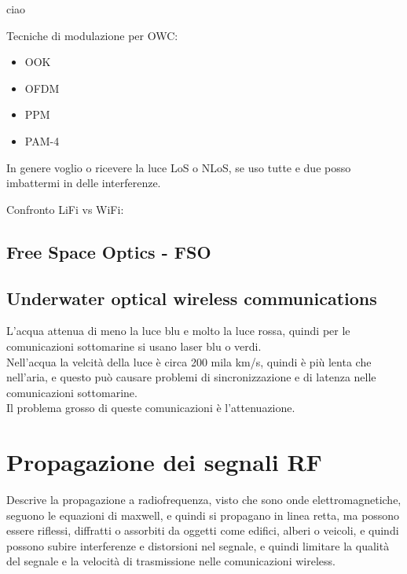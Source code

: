 ciao

Tecniche di modulazione per OWC:
\begin{itemize}
    \item OOK
    \item OFDM
    \item PPM
    \item PAM-4
\end{itemize}

In genere voglio o ricevere la luce LoS o NLoS, se uso tutte e due posso imbattermi in delle interferenze.

Confronto LiFi vs WiFi:

\subsection{Free Space Optics - FSO}

\subsection{Underwater optical wireless communications}
L'acqua attenua di meno la luce blu e molto la luce rossa, quindi per le comunicazioni sottomarine si usano laser blu o verdi.\\

Nell'acqua la velcità della luce è circa 200 mila km/s, quindi è più lenta che nell'aria, e questo può causare problemi di sincronizzazione e di latenza nelle comunicazioni sottomarine.\\

Il problema grosso di queste comunicazioni è l'attenuazione.
\section{Propagazione dei segnali RF}

Descrive la propagazione a radiofrequenza, visto che sono onde elettromagnetiche, seguono le equazioni di maxwell, e quindi si propagano in linea retta, ma possono essere riflessi, diffratti o assorbiti da oggetti come edifici, alberi o veicoli, e quindi possono subire interferenze e distorsioni nel segnale, e quindi limitare la qualità del segnale e la velocità di trasmissione nelle comunicazioni wireless.\\

